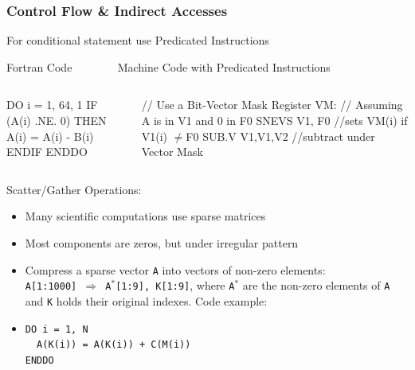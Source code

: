 \documentclass{beamer}
\newcommand{\mymath}[1]{$ #1 $}
\begin{document}
\begin{frame}[fragile,t]
\frametitle{Control Flow \& Indirect Accesses}


For conditional statement use Predicated Instructions
\begin{block}{Fortran Code{\tt~~~~~~~~}Machine Code with Predicated Instructions}
\begin{columns}
\begin{colorcode}[fontsize=\scriptsize]
DO i = 1, 64, 1
  IF (A(i) .NE. 0) THEN
    A(i) = A(i) - B(i)
  ENDIF
ENDDO
\end{colorcode} 
\begin{colorcode}[fontsize=\scriptsize]
// Use a Bit-Vector Mask Register VM:
// Assuming A is in V1 and 0 in F0
SNEVS V1, F0   //sets VM(i) if V1(i) \mymath{\neq}F0
SUB.V V1,V1,V2 //subtract under Vector Mask
\end{colorcode}
\end{columns}
\end{block}
\bigskip

Scatter/Gather Operations:
\begin{itemize}
    \item Many scientific computations use sparse matrices\smallskip
    \item Most components are zeros, but under irregular pattern\smallskip

    \item Compress a sparse vector {\tt A} into vectors of non-zero elements:\\
            {\tt A[1:1000] $\Rightarrow$ A$^*$[1:9], K[1:9]},
            where {\tt A$^*$} are the non-zero elements of {\tt A}
            and {\tt K} holds their original indexes. Code example:\smallskip

    \item {\tt DO i = 1, N}\\
            {\tt ~~A(K(i)) = A(K(i)) + C(M(i))}\\
            {\tt ENDDO}
\end  {itemize}

\end{frame}
\end{document}
